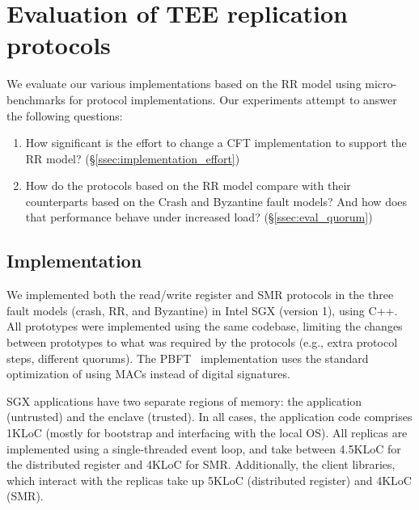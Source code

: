 \section{Evaluation of \ac{TEE} replication protocols}

We evaluate our various implementations based on the \ac{RR}
model using micro-benchmarks for protocol implementations. Our
experiments attempt to answer the following questions:

\begin{enumerate}
    \item How significant is the effort to change a \ac{CFT}
        implementation to support the \ac{RR} model?
        (\S\ref{ssec:implementation_effort})
    \item How do the protocols based on the \ac{RR} model
      compare with their counterparts based on the Crash and Byzantine
      fault models? And how does that performance behave under increased load?  (\S\ref{ssec:eval_quorum})
\end{enumerate}

\subsection{Implementation}\label{ssec:impl}

We implemented both the read/write register and SMR protocols in
the three fault models (crash, \ac{RR}, and Byzantine) in Intel
SGX (version 1), using C++. All prototypes were implemented using
the same codebase, limiting the changes between prototypes to
what was required by the protocols (e.g., extra protocol steps,
different quorums). The PBFT~\cite{pbft} implementation uses the
standard optimization of using MACs instead of digital
signatures.

SGX applications have two separate regions of memory: the
application (untrusted) and the enclave (trusted). In all cases,
the application code comprises 1KLoC (mostly for bootstrap and
interfacing with the local \ac{OS}). All replicas are implemented
using a single-threaded event loop, and take between 4.5KLoC for
the distributed register and 4KLoC for \ac{SMR}. Additionally, the client libraries, which
interact with the replicas take up 5KLoC (distributed
register) and 4KLoC (\ac{SMR}).


